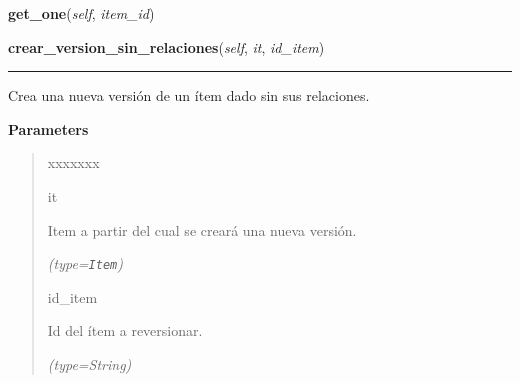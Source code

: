 \hspace{.8\funcindent}\begin{boxedminipage}{\funcwidth}

    \raggedright \textbf{get\_one}(\textit{self}, \textit{item\_id})

\setlength{\parskip}{2ex}
\setlength{\parskip}{1ex}
    \end{boxedminipage}

    \label{saip:controllers:version_controller:VersionController:crear_version_sin_relaciones}

    \vspace{0.5ex}

\hspace{.8\funcindent}\begin{boxedminipage}{\funcwidth}

    \raggedright \textbf{crear\_version\_sin\_relaciones}(\textit{self}, \textit{it}, \textit{id\_item})

    \vspace{-1.5ex}

    \rule{\textwidth}{0.5\fboxrule}
\setlength{\parskip}{2ex}
    Crea una nueva versión de un ítem dado sin sus relaciones.

\setlength{\parskip}{1ex}
      \textbf{Parameters}
      \vspace{-1ex}

      \begin{quote}
        \begin{Ventry}{xxxxxxx}

          \item[it]

          Item a partir del cual se creará una nueva versión.

            {\it (type=\texttt{Item})}

          \item[id\_item]

          Id del ítem a reversionar.

            {\it (type=String)}

        \end{Ventry}

      \end{quote}

    \end{boxedminipage}

